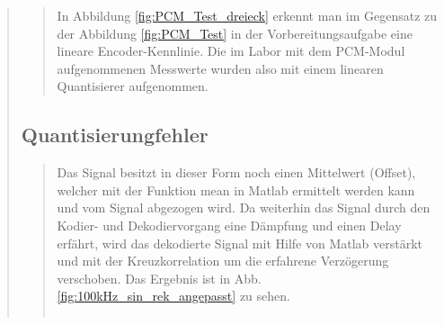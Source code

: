 \begin{quote}
\begin{quote}
    In Abbildung \ref{fig:PCM_Test_dreieck} erkennt man im Gegensatz zu der Abbildung \ref{fig:PCM_Test} in der
    Vorbereitungsaufgabe eine lineare Encoder-Kennlinie. Die im Labor mit dem PCM-Modul aufgenommenen Messwerte wurden
    also mit einem linearen Quantisierer aufgenommen.
    
    \end{quote}
    
    
    \subsection{Quantisierungfehler}
    
    \begin{quote}
        Das Signal besitzt in dieser Form noch einen Mittelwert (Offset), welcher mit der Funktion mean in Matlab ermittelt
        werden kann und vom Signal abgezogen wird. Da weiterhin das Signal durch den Kodier- und Dekodiervorgang eine
        Dämpfung und einen Delay erfährt, wird das dekodierte Signal mit Hilfe von Matlab verstärkt und mit der Kreuzkorrelation
        um die erfahrene Verzögerung verschoben. Das Ergebnis ist in Abb. \ref{fig:100kHz_sin_rek_angepasst} zu sehen. \\
        
        \begin{center}
            \begin{tabular}{ll}
            

\end{tabular}
\end{center}
\end{quote}
\end{quote}
